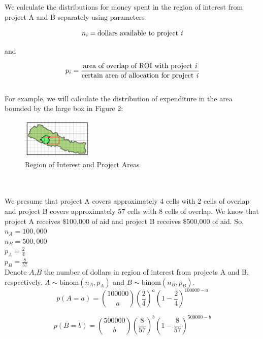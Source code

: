 \documentclass[12pt]{article}
\begin{document}
We calculate the distributions for money spent in the region of interest from project A and B
separately using parameters 

\begin{equation}
n_i = \mbox{dollars available to project \textit{i}}
\end{equation}

and

\begin{equation}
p_i = \frac{\mbox{area of overlap of ROI with project \textit{i}}}{\mbox{certain area of allocation for project \textit{i}}}
\end{equation}
\\
For example, we will calculate the distribution of expenditure in the area bounded by the large box in Figure 2:
\begin{figure}[!hbt]
\centering
\includegraphics[width=0.3\textwidth]{region_of_interest.JPG}
\caption{\label{fig:region_of_interest}Region of Interest and Project Areas}
\end{figure}
\\ \\
We presume that project A covers approximately 4 cells with 2 cells of overlap and project B covers approximately 57 cells with 8 cells of overlap. We know that project A receives \$100,000 of aid and project B receives \$500,000 of aid. So,
\\$n_A = 100,000$
\\$n_B = 500,000$
\\$p_A = \frac{2}{4}$
\\$p_B = \frac{8}{57}$
\\Denote $A$,$B$ the number of dollars in region of interest from projects A and B, respectively. $A \sim \mbox{binom}(n_A,p_A)$ and $B \sim \mbox{binom}(n_B,p_B)$.
\begin{equation}
p(A=a) = \binom{100000}{a}\left(\frac{2}{4}\right)^a \left(1-\frac{2}{4}\right)^{100000-a}
\end{equation}

\begin{equation}
p(B=b) = \binom{500000}{b}\left(\frac{8}{57}\right)^b \left(1-\frac{8}{57}\right)^{500000-b}
\end{equation}
\end{document}
